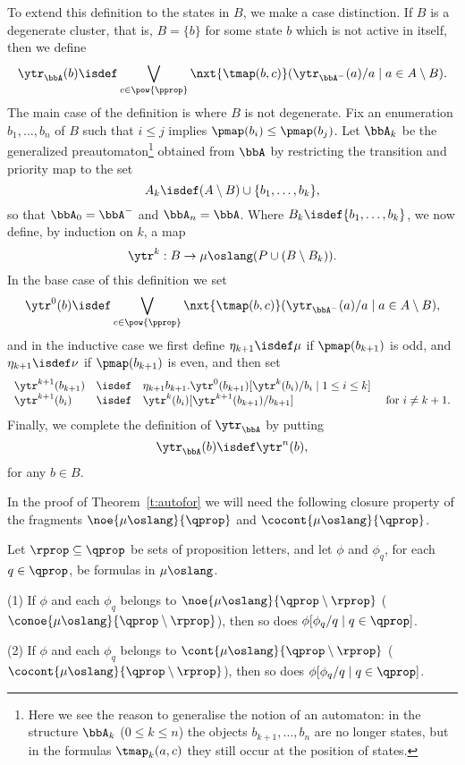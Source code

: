 \begin{definition}
To extend this definition to the states in $B$, we make a case 
distinction.
If $B$ is a degenerate cluster, that is, $B = \{ b \}$ for some state $b$ 
which is not active in itself, then we define
\[
\ytr_{\bbA}(b) \isdef
   \bigvee_{c \in \pow{\pprop}}
   \nxt{\tmap(b,c)}(\ytr_{\bbA^{-}}(a)/a \mid a \in A \setminus B).
\]
The main case of the definition is where $B$ is not degenerate.
Fix an enumeration $b_{1},\ldots,b_{n}$ of $B$ such that $i \leq j$ implies 
$\pmap(b_{i}) \leq \pmap(b_{j})$.
Let $\bbA_{k}$ be the generalized preautomaton\footnote{%
   Here we see the reason to generalise the notion of an automaton:
   in the structure $\bbA_{k}$ ($0 \leq k \leq n$) the objects $b_{k+1},\ldots,
   b_{n}$ are no longer states, but in the formulas $\tmap_{k}(a,c)$ they still 
   occur at the position of states.
}
obtained from $\bbA$ by restricting the transition and priority map to the set
\[
A_{k} \isdef (A\setminus B) \cup \{ b_{1},\ldots,b_{k} \},
\]
so that $\bbA_{0} = \bbA^{-}$ and $\bbA_{n} = \bbA$.
Where $B_{k} \isdef \{ b_{1},\ldots,b_{k} \}$, we now define, by induction on 
$k$, a map 
\[
\ytr^{k}: B \to \mu\oslang(P \cup (B \setminus B_{k})).
\]
In the base case of this definition we set
\[
\ytr^{0}(b) \isdef 
   \bigvee_{c \in \pow{\pprop}} 
   \nxt{\tmap(b,c)}(\ytr_{\bbA^{-}}(a)/a \mid a \in A \setminus B),
\]
and in the inductive case we first define $\eta_{k+1} \isdef \mu$ if
$\pmap(b_{k+1})$ is odd, and $\eta_{k+1} \isdef \nu$ if $\pmap(b_{k+1})$ is 
even, and then set
\[\begin{array}{llll}
     \ytr^{k+1}(b_{k+1}) &\isdef &
   \eta_{k+1} b_{k+1}. \ytr^{0}(b_{k+1})[\ytr^{k}(b_{i})/b_{i} \mid 1 \leq i\leq k]
\\ \ytr^{k+1}(b_{i}) &\isdef &
   \ytr^{k}(b_{i})[\ytr^{k+1}(b_{k+1})/b_{k+1}]
   & \text{ for } i \neq k+1.
\end{array}\]
Finally, we complete the definition of $\ytr_{\bbA}$ by putting
\[
\ytr_{\bbA}(b) \isdef \ytr^{n}(b),
\]
for any $b \in B$.
\end{definition}

In the proof of Theorem~\ref{t:autofor} we will need the following closure 
property of the fragments $\noe{\mu\oslang}{\qprop}$ and 
$\cocont{\mu\oslang}{\qprop}$.

\begin{proposition}
\label{p:comp}
Let $\rprop \subseteq \qprop$ be sets of proposition letters, and let $\phi$ 
and $\phi_{q}$, for each $q \in \qprop$, be formulas in $\mu\oslang$.

(1) If $\phi$ and each $\phi_{q}$ belongs to 
    $\noe{\mu\oslang}{\qprop\setminus\rprop}$ 
    ($\conoe{\mu\oslang}{\qprop\setminus\rprop}$), 
   then so does $\phi[\phi_{q}/q \mid q \in \qprop]$.

(2) If $\phi$ and each $\phi_{q}$ belongs to
   $\cont{\mu\oslang}{\qprop\setminus\rprop}$
   ($\cocont{\mu\oslang}{\qprop\setminus\rprop}$), 
   then so does $\phi[\phi_{q}/q \mid q \in \qprop]$.
\end{proposition}

